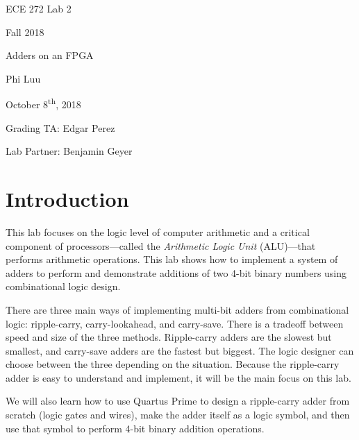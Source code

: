 \documentclass[12pt]{article}
\begin{document}
\begin{titlepage}
  \begin{center} \LARGE
    \vspace*{1.5in}

    ECE 272 Lab 2

    Fall 2018

    \vfill

    Adders on an FPGA

    Phi Luu

    \vfill

    October 8\textsuperscript{th}, 2018

    Grading TA: Edgar Perez

    Lab Partner: Benjamin Geyer

    \vspace{1.5in}
  \end{center}
\end{titlepage}

\section{Introduction}

This lab focuses on the logic level of computer arithmetic and a critical component of processors---called the \textit{Arithmetic Logic Unit} (ALU)---that performs arithmetic operations. This lab shows how to implement a system of adders to perform and demonstrate additions of two 4-bit binary numbers using combinational logic design.

There are three main ways of implementing multi-bit adders from combinational logic: ripple-carry, carry-lookahead, and carry-save. There is a tradeoff between speed and size of the three methods. Ripple-carry adders are the slowest but smallest, and carry-save adders are the fastest but biggest. The logic designer can choose between the three depending on the situation. Because the ripple-carry adder is easy to understand and implement, it will be the main focus on this lab.

We will also learn how to use Quartus Prime to design a ripple-carry adder from scratch (logic gates and wires), make the adder itself as a logic symbol, and then use that symbol to perform 4-bit binary addition operations.

\end{document}
